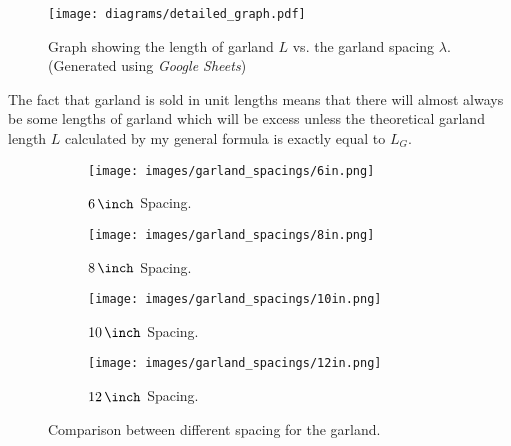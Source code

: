 \begin{figure}[H]
    \centering
    \texttt{[image: diagrams/detailed\_graph.pdf]}
    \caption{Graph showing the length of garland $L$ vs. the garland spacing $\lambda$.  (Generated using \emph{Google Sheets})}
\end{figure}

The fact that garland is sold in unit lengths means that there will almost always be some lengths of garland which will be excess unless the theoretical garland length $L$ calculated by my general formula is exactly equal to $L_G$.

\begin{figure}[H]
    \centering
    \begin{subfigure}[t]{0.15\textwidth}
        \centering
        \texttt{[image: images/garland\_spacings/6in.png]}
        \caption{$\US{6}{\inch}$ Spacing.}
    \end{subfigure}
    \hspace*{0.05\textwidth}
    \begin{subfigure}[t]{0.15\textwidth}
        \centering
        \texttt{[image: images/garland\_spacings/8in.png]}
        \caption{$\US{8}{\inch}$ Spacing.}
    \end{subfigure}
    \hspace*{0.05\textwidth}
    \begin{subfigure}[t]{0.15\textwidth}
        \centering
        \texttt{[image: images/garland\_spacings/10in.png]}
        \caption{$\US{10}{\inch}$ Spacing.}
    \end{subfigure}
    \hspace*{0.05\textwidth}
    \begin{subfigure}[t]{0.15\textwidth}
        \centering
        \texttt{[image: images/garland\_spacings/12in.png]}
        \caption{$\US{12}{\inch}$ Spacing.}
    \end{subfigure}
    \caption{Comparison between different spacing for the garland. }
\end{figure}
